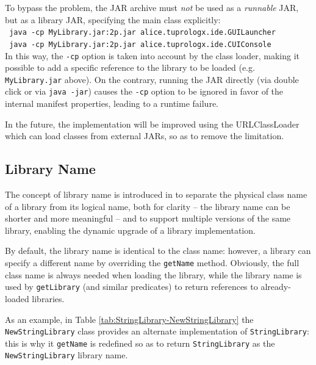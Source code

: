 To bypass the problem, the JAR archive must \textit{not} be used as a \textit{runnable} JAR, but as a library JAR, specifying the main class explicitly:\\

\noindent \texttt{~java -cp MyLibrary.jar:2p.jar alice.tuprologx.ide.GUILauncher}\\

\noindent \texttt{~java -cp MyLibrary.jar:2p.jar alice.tuprologx.ide.CUIConsole}\\

\noindent In this way, the \texttt{-cp} option is taken into account by the class loader, making it possible to add a specific reference to the library to be loaded (e.g. \texttt{MyLibrary.jar} above).
On the contrary, running the JAR directly (via double click or via \texttt{java -jar}) causes the \texttt{-cp} option to be ignored in favor of the internal manifest properties, leading to a runtime failure.

In the future, the implementation will be improved using the URLClassLoader which can load classes from external JARs, so as to remove the limitation.


\subsection{Library Name}
\label{ssec:library-name}

The concept of library name is introduced in \tuprolog{} to separate the physical class name of a library from its logical name, both for clarity -- the library name can be shorter and more meaningful -- and to support multiple versions of the same library, enabling the dynamic upgrade of a library implementation.

By default, the library name is identical to the class name: however, a library can specify a different name by overriding the \texttt{getName} method.
%
Obviously, the full class name is always needed when loading the library, while the library name is used by \texttt{getLibrary} (and similar predicates) to return references to already-loaded libraries.

As an example, in Table \ref{tab:StringLibrary-NewStringLibrary} the \texttt{NewStringLibrary} class provides an alternate implementation of \texttt{StringLibrary}: this is why it \texttt{getName} is redefined so as to return \texttt{StringLibrary} as the \texttt{NewStringLibrary} library name.

